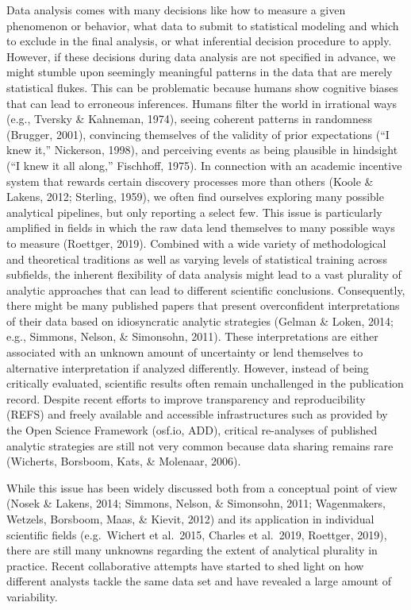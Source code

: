 \documentclass[
  english,
  man,floatsintext]{apa6}
\begin{document}
Data analysis comes with many decisions like how to measure a given phenomenon or behavior, what data to submit to statistical modeling and which to exclude in the final analysis, or what inferential decision procedure to apply.
However, if these decisions during data analysis are not specified in advance, we might stumble upon seemingly meaningful patterns in the data that are merely statistical flukes.
This can be problematic because humans show cognitive biases that can lead to erroneous inferences.
Humans filter the world in irrational ways (e.g., Tversky \& Kahneman, 1974), seeing coherent patterns in randomness (Brugger, 2001), convincing themselves of the validity of prior expectations ({``I knew it,''} Nickerson, 1998), and perceiving events as being plausible in hindsight ({``I knew it all along,''} Fischhoff, 1975).
In connection with an academic incentive system that rewards certain discovery processes more than others (Koole \& Lakens, 2012; Sterling, 1959), we often find ourselves exploring many possible analytical pipelines, but only reporting a select few.
This issue is particularly amplified in fields in which the raw data lend themselves to many possible ways to measure (Roettger, 2019).
Combined with a wide variety of methodological and theoretical traditions as well as varying levels of statistical training across subfields, the inherent flexibility of data analysis might lead to a vast plurality of analytic approaches that can lead to different scientific conclusions.
Consequently, there might be many published papers that present overconfident interpretations of their data based on idiosyncratic analytic strategies (Gelman \& Loken, 2014; e.g., Simmons, Nelson, \& Simonsohn, 2011).
These interpretations are either associated with an unknown amount of uncertainty or lend themselves to alternative interpretation if analyzed differently.
However, instead of being critically evaluated, scientific results often remain unchallenged in the publication record.
Despite recent efforts to improve transparency and reproducibility (REFS) and freely available and accessible infrastructures such as provided by the Open Science Framework (osf.io, ADD), critical re-analyses of published analytic strategies are still not very common because data sharing remains rare (Wicherts, Borsboom, Kats, \& Molenaar, 2006).

While this issue has been widely discussed both from a conceptual point of view (Nosek \& Lakens, 2014; Simmons, Nelson, \& Simonsohn, 2011; Wagenmakers, Wetzels, Borsboom, Maas, \& Kievit, 2012) and its application in individual scientific fields (e.g.~Wichert et al.~2015, Charles et al.~2019, Roettger, 2019), there are still many unknowns regarding the extent of analytical plurality in practice.
Recent collaborative attempts have started to shed light on how different analysts tackle the same data set and have revealed a large amount of variability.
\end{document}
